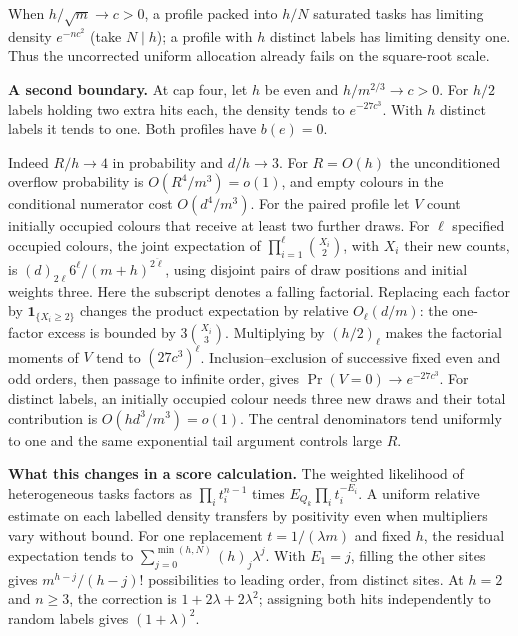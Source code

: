 When $h/\sqrt m\to c>0$, a profile packed into $h/N$ saturated tasks has limiting density $e^{-nc^2}$ (take $N\mid h$); a profile with $h$ distinct labels has limiting density one. Thus the uncorrected uniform allocation already fails on the square-root scale.

\textbf{A second boundary.} At cap four, let $h$ be even and $h/m^{2/3}\to c>0$. For $h/2$ labels holding two extra hits each, the density tends to $e^{-27c^3}$. With $h$ distinct labels it tends to one. Both profiles have $b(e)=0$.

Indeed $R/h\to4$ in probability and $d/h\to3$. For $R=O(h)$ the unconditioned overflow probability is $O(R^4/m^3)=o(1)$, and empty colours in the conditional numerator cost $O(d^4/m^3)$. For the paired profile let $V$ count initially occupied colours that receive at least two further draws. For $\ell$ specified occupied colours, the joint expectation of $\prod_{i=1}^\ell\binom{X_i}{2}$, with $X_i$ their new counts, is $(d)_{2\ell}6^\ell/(m+h)^{\overline{2\ell}}$, using disjoint pairs of draw positions and initial weights three. Here the subscript denotes a falling factorial. Replacing each factor by $\mathbf1_{\{X_i\ge2\}}$ changes the product expectation by relative $O_\ell(d/m)$: the one-factor excess is bounded by $3\binom{X_i}{3}$. Multiplying by $(h/2)_\ell$ makes the factorial moments of $V$ tend to $(27c^3)^\ell$. Inclusion--exclusion of successive fixed even and odd orders, then passage to infinite order, gives $\Pr(V=0)\to e^{-27c^3}$. For distinct labels, an initially occupied colour needs three new draws and their total contribution is $O(h d^3/m^3)=o(1)$. The central denominators tend uniformly to one and the same exponential tail argument controls large $R$.

\textbf{What this changes in a score calculation.} The weighted likelihood of heterogeneous tasks factors as $\prod_i t_i^{n-1}$ times $E_{Q_k}\prod_i t_i^{-E_i}$. A uniform relative estimate on each labelled density transfers by positivity even when multipliers vary without bound. For one replacement $t=1/(\lambda m)$ and fixed $h$, the residual expectation tends to $\sum_{j=0}^{\min(h,N)}(h)_j\lambda^j$. With $E_1=j$, filling the other sites gives $m^{h-j}/(h-j)!$ possibilities to leading order, from distinct sites. At $h=2$ and $n\ge3$, the correction is $1+2\lambda+2\lambda^2$; assigning both hits independently to random labels gives $(1+\lambda)^2$.

